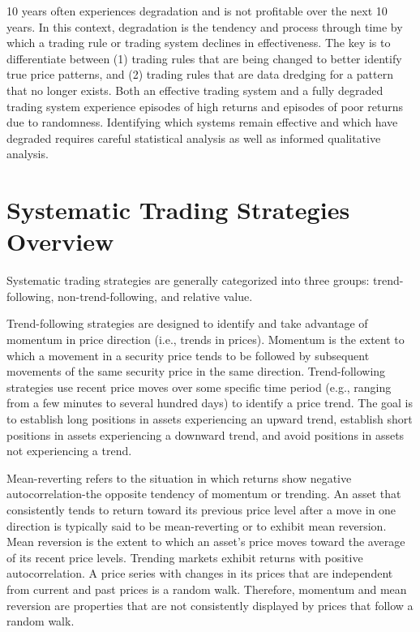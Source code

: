 \documentclass[11pt]{article}
\begin{document}
10 years often experiences degradation and is not profitable over the next 10 years. In this context, degradation is the tendency and process through time by which a trading rule or trading system declines in effectiveness. The key is to differentiate between (1) trading rules that are being changed to better identify true price patterns, and (2) trading rules that are data dredging for a pattern that no longer exists. Both an effective trading system and a fully degraded trading system experience episodes of high returns and episodes of poor returns due to randomness. Identifying which systems remain effective and which have degraded requires careful statistical analysis as well as informed qualitative analysis.

\section*{Systematic Trading Strategies Overview}
Systematic trading strategies are generally categorized into three groups: trend-following, non-trend-following, and relative value.

Trend-following strategies are designed to identify and take advantage of momentum in price direction (i.e., trends in prices). Momentum is the extent to which a movement in a security price tends to be followed by subsequent movements of the same security price in the same direction. Trend-following strategies use recent price moves over some specific time period (e.g., ranging from a few minutes to several hundred days) to identify a price trend. The goal is to establish long positions in assets experiencing an upward trend, establish short positions in assets experiencing a downward trend, and avoid positions in assets not experiencing a trend.

Mean-reverting refers to the situation in which returns show negative autocorrelation-the opposite tendency of momentum or trending. An asset that consistently tends to return toward its previous price level after a move in one direction is typically said to be mean-reverting or to exhibit mean reversion. Mean reversion is the extent to which an asset's price moves toward the average of its recent price levels. Trending markets exhibit returns with positive autocorrelation. A price series with changes in its prices that are independent from current and past prices is a random walk. Therefore, momentum and mean reversion are properties that are not consistently displayed by prices that follow a random walk.
\end{document}
